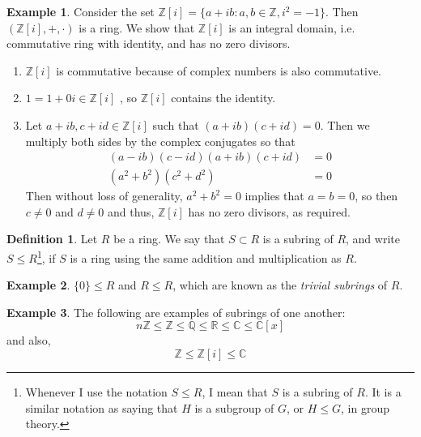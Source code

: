 \documentclass[11pt]{article}
\theoremstyle{definition}\newtheorem{definition}{Definition}
\theoremstyle{definition}\newtheorem*{notation}{Notation}
\theoremstyle{definition}\newtheorem{example}{Example}
\theoremstyle{theorem}\newtheorem{theorem}{Theorem}
\theoremstyle{theorem}\newtheorem{corollary}{Corollary}
\theoremstyle{theorem}\newtheorem{proposition}{Proposition}
\theoremstyle{theorem}\newtheorem{lemma}{Lemma}
\theoremstyle{theorem}\newtheorem{question}{Question}
\theoremstyle{remark}\newtheorem{remark}{Remark}
\newcommand{\C}{\mathbb{C}}
\newcommand{\R}{\mathbb{R}}
\newcommand{\Q}{\mathbb{Q}}
\newcommand{\Z}{\mathbb{Z}}
\begin{document}
\begin{example}
    Consider the set $\Z[i] = \{a + ib : a, b \in \Z, i^2 = -1\}$. Then $(\Z[i], +, \cdot)$ is a ring. We show that $\Z[i]$ is an integral domain, i.e. commutative ring with identity, and has no zero divisors.
    \begin{enumerate}
        \item $\Z[i]$ is commutative because of complex numbers is also commutative.
        \item $1 = 1 + 0i \in \Z[i]$ , so $\Z[i]$ contains the identity.
        \item Let $a + ib, c + id \in \Z[i]$ such that $(a + ib)(c + id) = 0$. Then we multiply both sides by the complex conjugates so that
        \begin{align*}
            (a - ib)(c - id)(a + ib)(c + id) &= 0 \\
            (a^2 + b^2)(c^2 + d^2) &= 0
        \end{align*}
        Then without loss of generality, $a^2 + b^2 = 0$ implies that $a = b = 0$, so then $c \neq 0$ and $d \neq 0$ and thus, $\Z[i]$ has no zero divisors, as required.
    \end{enumerate}
\end{example}

\begin{definition}
    Let $R$ be a ring. We say that $S \subset R$ is a subring of $R$, and write $S \leq R$\footnote{Whenever I use the notation $S \leq R$, I mean that $S$ is a subring of $R$. It is a similar notation as saying that $H$ is a subgroup of $G$, or $H \leq G$, in group theory.}, if $S$ is a ring using the same addition and multiplication as $R$.
\end{definition}

\begin{example}
    $\{0\} \leq R$ and $R \leq R$, which are known as the \emph{trivial subrings} of $R$.
\end{example}

\begin{example}
    The following are examples of subrings of one another:
    \begin{equation*}
        n\Z \leq \Z \leq \Q \leq \R \leq \C \leq \C[x]
    \end{equation*}
    and also,
    \begin{equation*}
        \Z \leq \Z[i] \leq \C
    \end{equation*}
\end{example}
\end{document}
